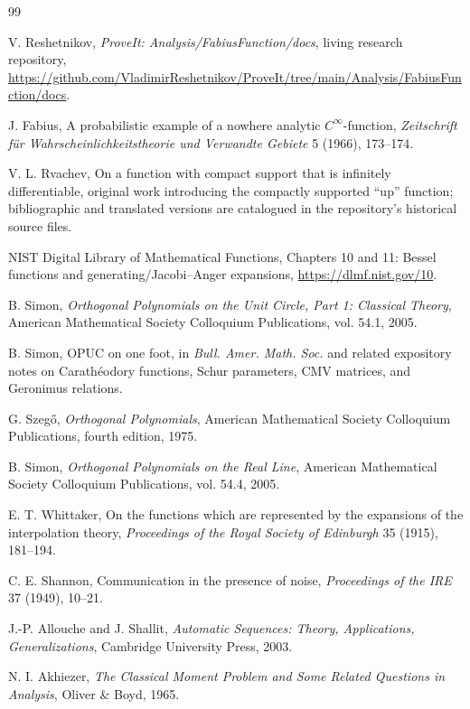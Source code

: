 \documentclass[11pt]{article}
\theoremstyle{definition}
\theoremstyle{remark}
\begin{document}
\begin{thebibliography}{99}

V. Reshetnikov,
\emph{ProveIt: Analysis/FabiusFunction/docs}, living research repository,
\url{https://github.com/VladimirReshetnikov/ProveIt/tree/main/Analysis/FabiusFunction/docs}.

J. Fabius,
A probabilistic example of a nowhere analytic \(C^\infty\)-function,
\emph{Zeitschrift f\"ur Wahrscheinlichkeitstheorie und Verwandte Gebiete} 5 (1966), 173--174.

V. L. Rvachev,
On a function with compact support that is infinitely differentiable,
original work introducing the compactly supported ``up'' function; bibliographic and
translated versions are catalogued in the repository's historical source files.

NIST Digital Library of Mathematical Functions,
Chapters 10 and 11: Bessel functions and generating/Jacobi--Anger expansions,
\url{https://dlmf.nist.gov/10}.

B. Simon,
\emph{Orthogonal Polynomials on the Unit Circle, Part 1: Classical Theory},
American Mathematical Society Colloquium Publications, vol. 54.1, 2005.

B. Simon,
OPUC on one foot,
in \emph{Bull. Amer. Math. Soc.} and related expository notes on Carath\'eodory functions,
Schur parameters, CMV matrices, and Geronimus relations.

G. Szeg\H{o},
\emph{Orthogonal Polynomials},
American Mathematical Society Colloquium Publications, fourth edition, 1975.

B. Simon,
\emph{Orthogonal Polynomials on the Real Line},
American Mathematical Society Colloquium Publications, vol. 54.4, 2005.

E. T. Whittaker,
On the functions which are represented by the expansions of the interpolation theory,
\emph{Proceedings of the Royal Society of Edinburgh} 35 (1915), 181--194.

C. E. Shannon,
Communication in the presence of noise,
\emph{Proceedings of the IRE} 37 (1949), 10--21.

J.-P. Allouche and J. Shallit,
\emph{Automatic Sequences: Theory, Applications, Generalizations},
Cambridge University Press, 2003.

N. I. Akhiezer,
\emph{The Classical Moment Problem and Some Related Questions in Analysis},
Oliver \& Boyd, 1965.

\end{thebibliography}
\end{document}
